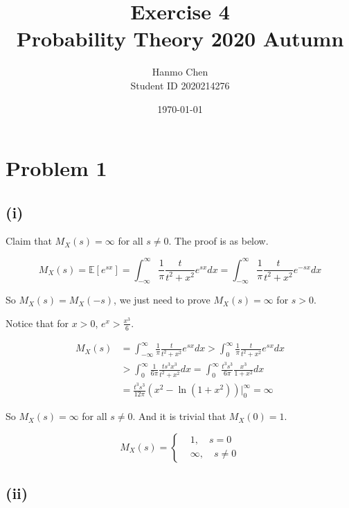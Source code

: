 \documentclass{article}
\title{Exercise 4 \\ Probability Theory 2020 Autumn}
\author{Hanmo Chen \\ Student ID 2020214276}
\date{\today}
\begin{document}
\maketitle
\tableofcontents
\newpage

\section{Problem 1}
\subsection{(i)}

Claim that $M_X(s) = \infty$ for all $s\neq 0$. The proof is as below.

\begin{equation}
    M_X(s) = \mathbb{E}[e^{sx}] = \int_{-\infty}^{\infty} \frac{1}{\pi} \frac{t}{t^2+x^2} e^{sx} dx = \int_{-\infty}^{\infty} \frac{1}{\pi} \frac{t}{t^2+x^2} e^{-sx} dx
\end{equation}

So $M_X(s) = M_X(-s)$, we just need to prove $M_X(s) = \infty$ for $s>0$. 

Notice that for $x>0$, $e^x > \frac {x^3}{6}$.

\begin{equation}
    \begin{aligned}
        M_X(s) & = \int_{-\infty}^{\infty} \frac{1}{\pi} \frac{t}{t^2+x^2} e^{sx} dx > \int_{0}^{\infty} \frac{1}{\pi} \frac{t}{t^2+x^2} e^{sx} dx \\
        & > \int_{0}^{\infty} \frac{1}{6\pi} \frac{ts^3 x^3}{t^2+x^2} dx =  \int_{0}^{\infty} \frac{t^3s^3}{6\pi} \frac{x^3}{1+x^2} dx \\
        & = \frac{t^3s^3}{12\pi} (x^2-\ln(1+x^2)) \big|_{0}^{\infty} = \infty
    \end{aligned}
\end{equation}

So $M_X(s) = \infty$ for all $s\neq 0$. And it is trivial that $M_X(0) = 1$.


\begin{equation}
    M_X(s) = \left\{  \begin{aligned}
        &1,\quad s =0\\
        &\infty, \quad s\neq 0
    \end{aligned}
        \right.
\end{equation}

\subsection{(ii)}
\end{document}
